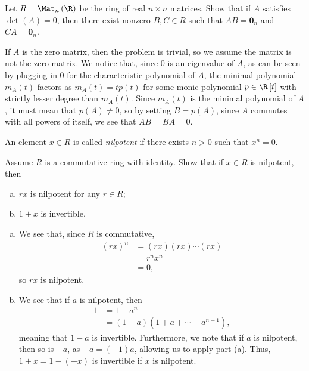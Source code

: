 \documentclass[10pt]{mypackage}
\begin{document}
\begin{problem}[Problem 5]
  Let $ R = \Mat_{n}\left( \R \right) $ be the ring of real $n\times n$ matrices. Show that if $A$ satisfies $\det\left( A \right) = 0$, then there exist nonzero $B,C\in R$ such that $AB = \mathbf{0}_{n}$ and $CA = \mathbf{0}_{n}$.
\end{problem}
\begin{solution}
  If $A$ is the zero matrix, then the problem is trivial, so we assume the matrix is not the zero matrix. We notice that, since $0$ is an eigenvalue of $A$, as can be seen by plugging in $0$ for the characteristic polynomial of $A$, the minimal polynomial $m_A(t)$ factors as $m_A(t) =t p(t)$ for some monic polynomial $p\in \R\left[ t \right]$ with strictly lesser degree than $m_A(t)$. Since $m_A(t)$ is the minimal polynomial of $A$, it must mean that $p(A) \neq 0$, so by setting $B = p(A)$, since $A$ commutes with all powers of itself, we see that $AB = BA = 0$.
\end{solution}
\begin{problem}[Problem 6]
  An element $x\in R$ is called \textit{nilpotent} if there exists $n > 0$ such that $x^{n} = 0$.\newline

  Assume $R$ is a commutative ring with identity. Show that if $x\in R$ is nilpotent, then
  \begin{enumerate}[(a)]
    \item $rx$ is nilpotent for any $r\in R$;
    \item $1+x$ is invertible.
  \end{enumerate}
\end{problem}
\begin{solution}\hfill
  \begin{enumerate}[(a)]
    \item We see that, since $R$ is commutative,
      \begin{align*}
        \left( rx \right)^{n} &= \left( rx \right)\left( rx \right)\cdots \left( rx \right)\\
                              &= r^{n}x^{n}\\
                              &= 0,
      \end{align*}
      so $rx$ is nilpotent.
    \item We see that if $a$ is nilpotent, then
      \begin{align*}
        1 &= 1-a^{n}\\
          &= \left( 1-a \right)\left( 1 + a + \cdots + a^{n-1} \right),
      \end{align*}
      meaning that $1-a$ is invertible. Furthermore, we note that if $a$ is nilpotent, then so is $-a$, as $-a = \left( -1 \right)a$, allowing us to apply part (a). Thus, $1+x = 1-\left( -x \right)$ is invertible if $x$ is nilpotent.
  \end{enumerate}
\end{solution}
\end{document}
